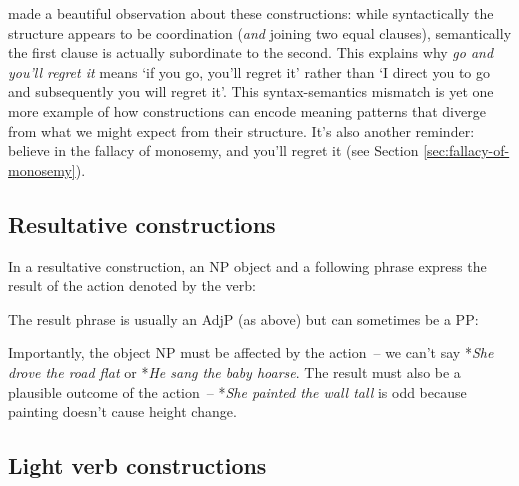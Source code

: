 \begin{tcolorbox}[title=Another Syntax-Semantics Mismatch]
\citet{culicover1997semantic} made a beautiful observation about these constructions: while syntactically the structure appears to be coordination (\textit{and} joining two equal clauses), semantically the first clause is actually subordinate to the second. This explains why \textit{go and you'll regret it} means `if you go, you'll regret it' rather than `I direct you to go and subsequently you will regret it'. This syntax-semantics mismatch is yet one more example of how constructions can encode meaning patterns that diverge from what we might expect from their structure. It's also another reminder: believe in the fallacy of monosemy, and you'll regret it (see Section \ref{sec:fallacy-of-monosemy}).
\end{tcolorbox}

\subsection{Resultative constructions}

In a resultative construction, an NP object and a following phrase express the result of the action denoted by the verb:

\ea\label{ex:resultative}
   \z
\z

The result phrase is usually an AdjP (as above) but can sometimes be a PP:

\ea\label{ex:resultative-pp}
   \z
\z

Importantly, the object NP must be affected by the action~-- we can't say *\textit{She drove the road flat} or *\textit{He sang the baby hoarse}. The result must also be a plausible outcome of the action~-- *\textit{She painted the wall tall} is odd because painting doesn't cause height change.

\subsection{Light verb constructions}

